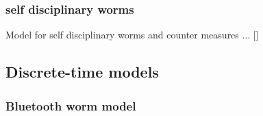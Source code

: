 %
\subsubsection*{self disciplinary worms}
Model for self disciplinary worms and counter measures ... []  


\subsection{Discrete-time models}
\subsubsection{Bluetooth worm model}

